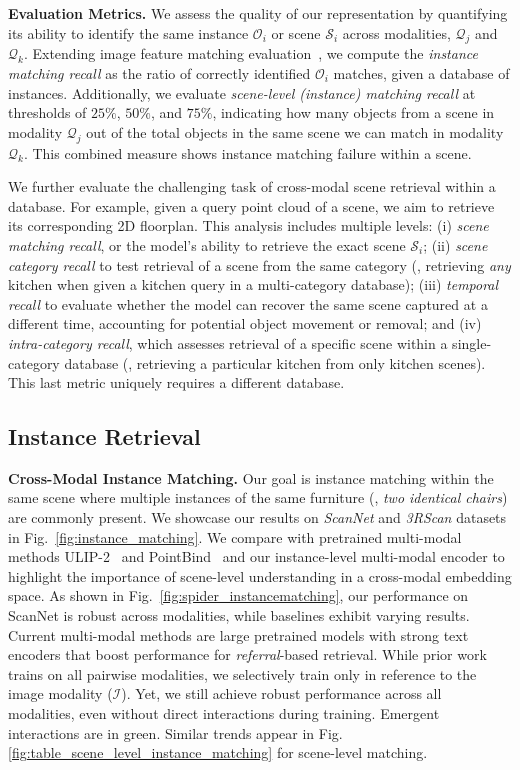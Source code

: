 \noindent
\textbf{Evaluation Metrics.}
We assess the quality of our representation by quantifying its ability to identify the same instance $\mathcal{O}_i$ or scene $\mathcal{S}_i$ across modalities, $\mathcal{Q}_j$ and $\mathcal{Q}_k$. Extending image feature matching evaluation~\cite{lowe2004, sarlin20superglue}, we compute the \textit{instance matching recall} as the ratio of correctly identified $\mathcal{O}_i$ matches, given a database of instances. Additionally, we evaluate \textit{scene-level (instance) matching recall} at thresholds of $25\%$, $50\%$, and $75\%$, indicating how many objects from a scene in modality $\mathcal{Q}_j$ out of the total objects in the same scene we can match in modality $\mathcal{Q}_k$. This combined measure shows instance matching failure within a scene.

We further evaluate the challenging task of cross-modal scene retrieval within a database. For example, given a query point cloud of a scene, we aim to retrieve its corresponding 2D floorplan. This analysis includes multiple levels: (i) \textit{scene matching recall}, or the model's ability to retrieve the exact scene $\mathcal{S}_i$; (ii) \textit{scene category recall} to test retrieval of a scene from the same category (\eg, retrieving \textit{any} kitchen when given a kitchen query in a multi-category database); (iii) \textit{temporal recall} to evaluate whether the model can recover the same scene captured at a different time, accounting for potential object movement or removal; and (iv) \textit{intra-category recall}, which assesses retrieval of a specific scene within a single-category database (\eg, retrieving a particular kitchen from only kitchen scenes). This last metric uniquely requires a different database.

\subsection{Instance Retrieval}
\noindent \textbf{Cross-Modal Instance Matching.}  Our goal is instance matching within the same scene where multiple instances of the same furniture (\eg, \textit{two identical chairs}) are commonly present. We showcase our results on \textit{ScanNet} and \textit{3RScan} datasets in Fig.~\ref{fig:instance_matching}. We compare \project{} with pretrained multi-modal methods ULIP-2~\cite{xue2023ulip2} and PointBind~\cite{pointbind} and our instance-level multi-modal encoder to highlight the importance of scene-level understanding in a cross-modal embedding space. As shown in Fig.~\ref{fig:spider_instancematching}, our performance on ScanNet is robust across modalities, while baselines exhibit varying results. Current multi-modal methods are large pretrained models with strong text encoders that boost performance for \textit{referral}-based retrieval. While prior work trains on all pairwise modalities, we selectively train only in reference to the image modality ($\mathcal{I}$). Yet, we still achieve robust performance across all modalities, even without direct interactions during training. Emergent interactions are in \textcolor{spidergreen}{green}. Similar trends appear in Fig. \ref{fig:table_scene_level_instance_matching} for scene-level matching.

